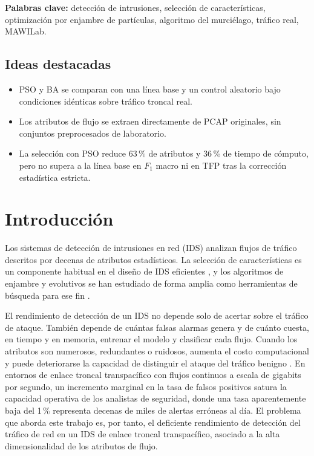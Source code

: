 \documentclass[11pt,a4paper]{article}
\begin{document}
\medskip
\noindent\textbf{Palabras clave:} detección de intrusiones, selección de características, optimización por enjambre de partículas, algoritmo del murciélago, tráfico real, MAWILab.

\subsection*{Ideas destacadas}
\begin{itemize}[leftmargin=1.5em,itemsep=0pt,topsep=2pt]
  \item PSO y BA se comparan con una línea base y un control aleatorio bajo condiciones idénticas sobre tráfico troncal real.
  \item Los atributos de flujo se extraen directamente de PCAP originales, sin conjuntos preprocesados de laboratorio.
  \item La selección con PSO reduce 63\,\% de atributos y 36\,\% de tiempo de cómputo, pero no supera a la línea base en $F_1$ macro ni en TFP tras la corrección estadística estricta.
\end{itemize}

\section{Introducción}

Los sistemas de detección de intrusiones en red (IDS) analizan flujos de tráfico descritos por decenas de atributos estadísticos. La selección de características es un componente habitual en el diseño de IDS eficientes \parencite{zhou2020}, y los algoritmos de enjambre y evolutivos se han estudiado de forma amplia como herramientas de búsqueda para ese fin \parencite{thakkar2020}.

El rendimiento de detección de un IDS no depende solo de acertar sobre el tráfico de ataque. También depende de cuántas falsas alarmas genera y de cuánto cuesta, en tiempo y en memoria, entrenar el modelo y clasificar cada flujo. Cuando los atributos son numerosos, redundantes o ruidosos, aumenta el costo computacional y puede deteriorarse la capacidad de distinguir el ataque del tráfico benigno \parencite{zhou2020,thakkar2020}. En entornos de enlace troncal transpacífico con flujos continuos a escala de gigabits por segundo, un incremento marginal en la tasa de falsos positivos satura la capacidad operativa de los analistas de seguridad, donde una tasa aparentemente baja del 1\,\% representa decenas de miles de alertas erróneas al día. El problema que aborda este trabajo es, por tanto, el deficiente rendimiento de detección del tráfico de red en un IDS de enlace troncal transpacífico, asociado a la alta dimensionalidad de los atributos de flujo.
\end{document}
